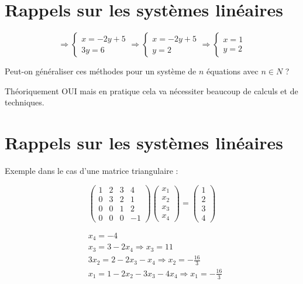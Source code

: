 \documentclass[10pt]{article}
\begin{document}
\section*{Rappels sur les systèmes linéaires}
\[
\Rightarrow\left\{\begin{array} { c } 
{ x = - 2 y + 5 } \\
{ 3 y = 6 }
\end{array} \Rightarrow \left\{\begin{array} { c } 
{ x = - 2 y + 5 } \\
{ y = 2 }
\end{array} \Rightarrow \left\{\begin{array}{l}
x=1 \\
y=2
\end{array}\right.\right.\right.
\]

Peut-on généraliser ces méthodes pour un système de \(n\) équations avec \(n \in N\) ?

Théoriquement OUI mais en pratique cela va nécessiter beaucoup de calculs et de techniques.

\section*{Rappels sur les systèmes linéaires}
Exemple dans le cas d'une matrice triangulaire :

\[
\left(\begin{array}{cccc}
1 & 2 & 3 & 4 \\
0 & 3 & 2 & 1 \\
0 & 0 & 1 & 2 \\
0 & 0 & 0 & -1
\end{array}\right)\left(\begin{array}{l}
x_{1} \\
x_{2} \\
x_{3} \\
x_{4}
\end{array}\right)=\left(\begin{array}{l}
1 \\
2 \\
3 \\
4
\end{array}\right)
\]

\[
\begin{aligned}
& x_{4}=-4 \\
& x_{3}=3-2 x_{4} \Rightarrow x_{3}=11 \\
& 3 x_{2}=2-2 x_{3}-x_{4} \Rightarrow x_{2}=-\frac{16}{3} \\
& x_{1}=1-2 x_{2}-3 x_{3}-4 x_{4} \Rightarrow x_{1}=-\frac{16}{3}
\end{aligned}
\]
\end{document}
